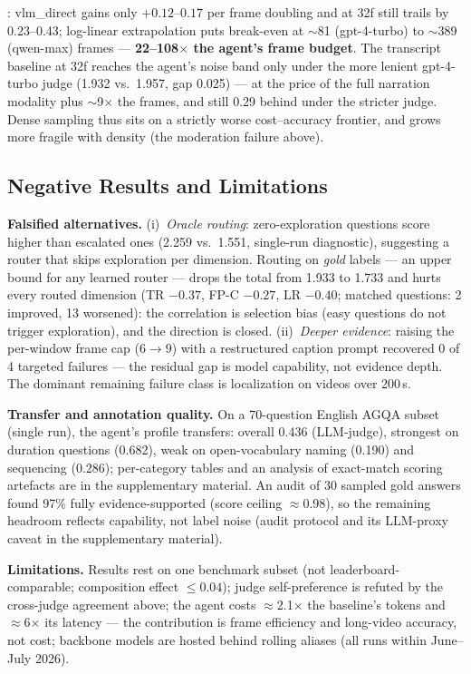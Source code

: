 : vlm\_direct gains only $+0.12$--$0.17$
per frame doubling and at 32f still trails by 0.23--0.43; log-linear extrapolation
puts break-even at $\sim$81 (gpt-4-turbo) to $\sim$389 (qwen-max) frames ---
\textbf{22--108$\times$ the agent's frame budget}. The transcript baseline at 32f
reaches the agent's noise band only under the more lenient gpt-4-turbo judge
(1.932 vs.\ 1.957, gap 0.025) --- at the price of the full narration modality plus
$\sim$9$\times$ the frames, and still 0.29 behind under the stricter judge. Dense
sampling thus sits on a strictly worse cost--accuracy frontier, and grows more
fragile with density (the moderation failure above).

\subsection{Negative Results and Limitations}
\label{subsec:exp-limits}

\textbf{Falsified alternatives.} (i)~\emph{Oracle routing}: zero-exploration
questions score higher than escalated ones (2.259 vs.\ 1.551, single-run
diagnostic), suggesting a router that skips exploration per dimension. Routing on
\emph{gold} labels --- an upper bound for any learned router --- drops the total
from 1.933 to 1.733 and hurts every routed dimension (TR $-0.37$, FP-C $-0.27$,
LR $-0.40$; matched questions: 2 improved, 13 worsened): the correlation is
selection bias (easy questions do not trigger exploration), and the direction is
closed. (ii)~\emph{Deeper evidence}: raising the per-window frame cap ($6 \to 9$)
with a restructured caption prompt recovered 0 of 4 targeted failures --- the
residual gap is model capability, not evidence depth. The dominant remaining
failure class is localization on videos over 200\,s.

\textbf{Transfer and annotation quality.} On a 70-question English AGQA
subset~\cite{grundemclaughlin2021agqa} (single run), the agent's profile
transfers: overall 0.436 (LLM-judge), strongest on duration questions (0.682),
weak on open-vocabulary naming (0.190) and sequencing (0.286); per-category tables and an
analysis of exact-match scoring artefacts are in the supplementary material. An
audit of 30 sampled gold answers found 97\% fully evidence-supported (score
ceiling $\approx$0.98), so the remaining headroom reflects capability, not label
noise (audit protocol and its LLM-proxy caveat in the supplementary material).

\textbf{Limitations.} Results rest on one benchmark subset (not
leaderboard-comparable; composition effect $\leq 0.04$); judge self-preference is
refuted by the cross-judge agreement above; the agent costs $\approx$2.1$\times$
the baseline's tokens and $\approx$6$\times$ its latency --- the contribution is
frame efficiency and long-video accuracy, not cost; backbone models are hosted
behind rolling aliases (all runs within June--July 2026).
